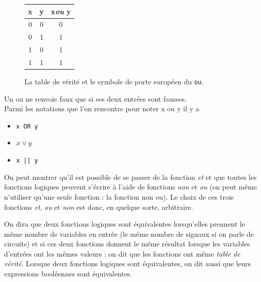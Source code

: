 \begin{figure}[H]
    \begin{center}
        \begin{tabular}{|c|c|c|}
            \hline\rowcolor{UGLiOrange}
            {\boxfont\color{white}x} & {\boxfont\color{white}y} & {\boxfont\color{white}x\textit{ou} y} \\

            \hline
            0                        & 0                        & 0                                     \\
            \hline
            0                        & 1                        & 1                                     \\
            \hline
            1                        & 0                        & 1                                     \\
            \hline
            1                        & 1                        & 1                                     \\
            \hline
        \end{tabular}\hspace{3em}
    \end{center}
    \caption*{La table de vérité et le symbole de porte européen du \texttt{ou}.}
\end{figure}

Un \og ou\fg{} ne renvoie faux que si ses deux entrées sont fausses.\\
Parmi les notations que l'on rencontre pour noter \og x ou y\fg{} il y a
\begin{itemize}
    \item 	 \texttt{x OR y}
    \item 	$x\vee y$
    \item 	\texttt{x || y}
\end{itemize}

On peut montrer qu'il est possible de se passer de la fonction \textit{et} et que toutes les fonctions logiques peuvent s'écrire à l'aide de
fonctions \textit{non} et \textit{ou} (on peut même n'utiliser qu'une seule fonction : la fonction \og non ou\fg{}). Le choix de ces trois fonctions
\textit{et}, \textit{ou} et \textit{non} est donc, en quelque sorte, arbitraire.

\begin{definition}
    On dira que deux fonctions logiques sont équivalentes lorsqu'elles prennent le même nombre de variables en entrée (le même nombre de signaux si on parle de circuits) et si ces deux fonctions donnent le même résultat lorsque les variables d'entrées ont les mêmes valeurs : on dit que les fonctions ont même \textit{table de vérité}.
    Lorsque deux fonctions logiques sont équivalentes, on dit aussi que leurs expressions booléennes sont équivalentes.
\end{definition}

